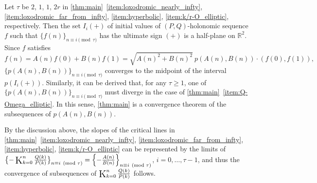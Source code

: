 \documentclass[a4paper,UKenglish,cleveref,autoref,thm-restate]{lipics-v2021}
\newcommand{\R}{\mathbb{R}}
\newcommand\Kettenbruch{\operatornamewithlimits{\mathchoice
     {\vcenter{\hbox{\huge $\mathrm{K}$}}}
     {\vcenter{\hbox{\Large $\mathrm{K}$}}}
     {\mathrm{K}}
     {\mathrm{K}}}}
\begin{document}
Let $\tau$ be $2$, $1$, $1$, $2r$ in \cref{thm:main}~\eqref{item:loxodromic_nearly_infty}, \eqref{item:loxodromic_far_from_infty}, \eqref{item:hyperbolic}, \eqref{item:k/r-O_elliptic}, respectively. Then the set $I_i(+)$ of initial values of $(P, Q)$-holonomic sequence $f$ such that $\{ f(n) \}_{n \equiv i \pmod{\tau}}$ has the ultimate sign $(+)$ is a half-plane on $\R^2$. 
Since $f$ satisfies
\begin{equation}\label{eq:f=f0w}
f(n) = A(n)f(0) + B(n)f(1) = \sqrt{A(n)^2 + B(n)^2} \ p(A(n), B(n)) \cdot (f(0), f(1)), 
\end{equation}
$\{ p(A(n), B(n)) \}_{n \equiv i \pmod{\tau}}$ converges to the midpoint of the interval $p(I_i(+))$. 
Similarly, it can be derived that, for any $\tau \geq 1$, one of $\{ p(A(n), B(n)) \}_{n \equiv i \pmod{\tau}}$ must diverge in the case of \cref{thm:main}~\eqref{item:Q-Omega_elliptic}. 
In this sense, \cref{thm:main} is a convergence theorem of the subsequences of $p(A(n), B(n))$. 

By the discussion above, the slopes of the critical lines in \cref{thm:main}~\eqref{item:loxodromic_nearly_infty}, \eqref{item:loxodromic_far_from_infty}, \eqref{item:hyperbolic}, \eqref{item:k/r-O_elliptic} can be represented by the limits of $\bigl\{ -\Kettenbruch _{k=0}^{n} \frac{Q(k)}{P(k)} \bigr\}_{n \equiv i \pmod{\tau}} = \left\{ -\frac{A(n)}{B(n)} \right\}_{n \equiv i \pmod{\tau}}$, $i=0, \dots, \tau-1$, and thus the convergence of subsequences of $\Kettenbruch_{k=0}^n \frac{Q(k)}{P(k)}$ follows. 
\end{document}
